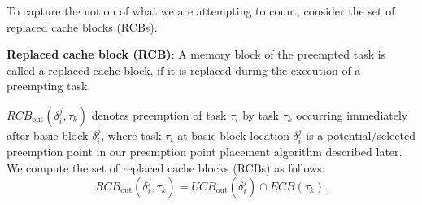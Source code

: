 To capture the notion of what we are attempting to count, consider the set of replaced cache blocks (RCBs).

\begin{definition}
\textbf{Replaced cache block (RCB)}: A memory block of the preempted task is called a replaced cache block, if it is replaced during the execution of a preempting task.
\end{definition}

\noindent \begin{math}\textit{RCB}_{\textrm{out}}(\delta_{i}^{j},\tau_{k})\end{math} denotes preemption of task \begin{math}\tau_{i}\end{math} by task \begin{math}\tau_{k}\end{math} occurring immediately after basic block \begin{math}\delta_{i}^{j}\end{math}, where task \begin{math}\tau_{i}\end{math} at basic block location \begin{math}\delta_{i}^{j}\end{math} is a potential/selected preemption point in our preemption point placement algorithm described later.  We compute the set of replaced cache blocks (RCBs) as follows:
\begin{equation}\label{eqn:rcb-formula}
    \textit{RCB}_{\textrm{out}}(\delta_{i}^{j},\tau_{k}) = \textit{UCB}_{\textrm{out}}(\delta_{i}^{j}) \cap \textit{ECB}(\tau_{k}).
\end{equation}
%
